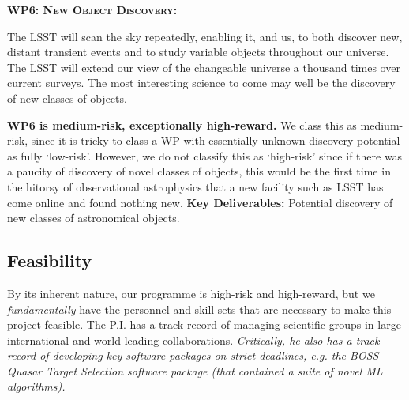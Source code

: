 \medskip
\medskip
\smallskip
\smallskip
\noindent
\textbf{\textsc{WP6: New Object Discovery:}} 

\smallskip
\smallskip
\noindent
The LSST will scan the sky repeatedly, enabling it, and us, to both
discover new, distant transient events and to study variable objects
throughout our universe. The LSST will extend our view of the
changeable universe a thousand times over current surveys.  The most
interesting science to come may well be the discovery of new classes
of objects.

\smallskip
\smallskip
\noindent
{\bf WP6 is medium-risk, exceptionally high-reward.}  We class this as
medium-risk, since it is tricky to class a WP with essentially unknown
discovery potential as fully `low-risk'. However, we do not classify
this as `high-risk' since if there was a paucity of discovery of novel
classes of objects, this would be the first time in the hitorsy of
observational astrophysics that a new facility such as LSST has come
online and found nothing new.  {\bf Key Deliverables:} Potential
discovery of new classes of astronomical objects.



\medskip  \medskip \smallskip \smallskip \noindent
\subsection{Feasibility}

\smallskip
\smallskip
\noindent
By its inherent nature, our programme is high-risk and high-reward, but
we {\it fundamentally} have the personnel and skill sets that are 
necessary to make this project feasible. 
The P.I. has a track-record of managing scientific groups in 
large international and world-leading collaborations. {\it Critically, 
he also has a track record of developing key software packages 
on strict deadlines, e.g. the BOSS Quasar Target Selection software 
package (that contained a suite of novel ML algorithms).}
%
%

%
%




